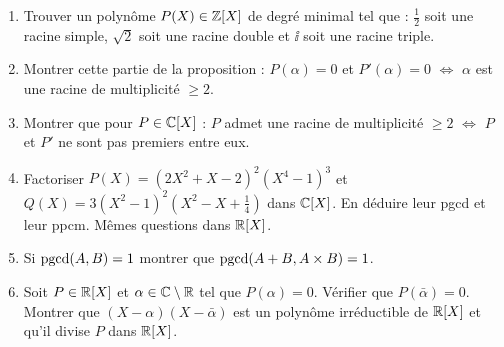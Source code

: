\begin{frame}

\begin{miniexercice}
\begin{enumerate}
  \item Trouver un polynôme $P(X) \in \mathbb{Z}[X]$ de degré minimal tel que : $\frac 12$ soit une racine simple,
$\sqrt 2$ soit une racine double et $\ii$ soit une racine triple.

  \item Montrer cette partie de la proposition :
\og$P(\alpha)=0$ et $P'(\alpha)=0$  $\iff$ $\alpha$ est une racine de multiplicité $\ge 2$\fg.

  \item Montrer que pour $P\in\mathbb{C} [X]$ :
\og$P$ admet une racine de multiplicité $\ge 2$ $\iff$ $P$ et $P'$ ne sont pas premiers entre eux\fg.

  \item Factoriser $P(X) = (2X^2+X-2)^2(X^4-1)^3$ et $Q(X)=3(X^2-1)^2(X^2-X+\frac14)$ dans $\mathbb{C}[X]$.
En déduire leur pgcd et leur ppcm. Mêmes questions dans $\mathbb{R}[X]$.

  \item Si $\mathop{\text{pgcd}}\nolimits(A,B)=1$ montrer que $\mathop{\text{pgcd}}\nolimits(A+B,A\times B)=1$.

  \item Soit $P\in \mathbb{R}[X]$ et $\alpha \in \mathbb{C}\setminus\mathbb{R}$ tel que $P(\alpha)=0$.
Vérifier que $P(\bar \alpha)=0$. Montrer que $(X-\alpha)(X-\bar\alpha)$ est un polynôme irréductible de $\mathbb{R}[X]$
et qu'il divise $P$ dans $\mathbb{R}[X]$.
\end{enumerate}
\end{miniexercice}

\end{frame}

